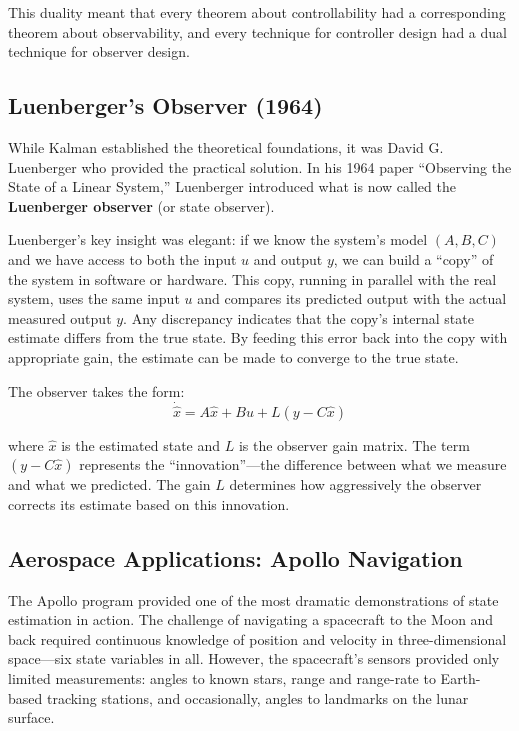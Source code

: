 This duality meant that every theorem about controllability had a corresponding theorem about observability, and every technique for controller design had a dual technique for observer design.

\subsection{Luenberger's Observer (1964)}

While Kalman established the theoretical foundations, it was David G. Luenberger who provided the practical solution. In his 1964 paper ``Observing the State of a Linear System,'' Luenberger introduced what is now called the \textbf{Luenberger observer} (or state observer).

Luenberger's key insight was elegant: if we know the system's model $(A, B, C)$ and we have access to both the input $u$ and output $y$, we can build a ``copy'' of the system in software or hardware. This copy, running in parallel with the real system, uses the same input $u$ and compares its predicted output with the actual measured output $y$. Any discrepancy indicates that the copy's internal state estimate differs from the true state. By feeding this error back into the copy with appropriate gain, the estimate can be made to converge to the true state.

The observer takes the form:
\begin{equation}
\dot{\hat{x}} = A\hat{x} + Bu + L(y - C\hat{x})
\label{eq:luenberger_observer_intro}
\end{equation}

where $\hat{x}$ is the estimated state and $L$ is the observer gain matrix. The term $(y - C\hat{x})$ represents the ``innovation''---the difference between what we measure and what we predicted. The gain $L$ determines how aggressively the observer corrects its estimate based on this innovation.

\subsection{Aerospace Applications: Apollo Navigation}

The Apollo program provided one of the most dramatic demonstrations of state estimation in action. The challenge of navigating a spacecraft to the Moon and back required continuous knowledge of position and velocity in three-dimensional space---six state variables in all. However, the spacecraft's sensors provided only limited measurements: angles to known stars, range and range-rate to Earth-based tracking stations, and occasionally, angles to landmarks on the lunar surface.

